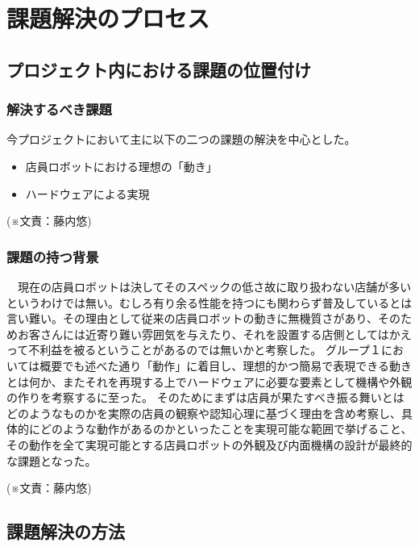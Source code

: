 \chapter{課題解決のプロセス}
\begin{comment}
各々のメンバーに割り当てられた課題解決の方法とプロセスを記述する。
\end{comment}
\section{プロジェクト内における課題の位置付け}
\subsection{解決するべき課題}
今プロジェクトにおいて主に以下の二つの課題の解決を中心とした。
\begin{itemize}
\item 店員ロボットにおける理想の「動き」
\item ハードウェアによる実現
\end{itemize}
\begin{flushright}
(※文責：藤内悠)
\end{flushright}
\subsection{課題の持つ背景}
\noindent
　現在の店員ロボットは決してそのスペックの低さ故に取り扱わない店舗が多いというわけでは無い。むしろ有り余る性能を持つにも関わらず普及しているとは言い難い。その理由として従来の店員ロボットの動きに無機質さがあり、そのためお客さんには近寄り難い雰囲気を与えたり、それを設置する店側としてはかえって不利益を被るということがあるのでは無いかと考察した。
グループ１においては概要でも述べた通り「動作」に着目し、理想的かつ簡易で表現できる動きとは何か、またそれを再現する上でハードウェアに必要な要素として機構や外観の作りを考察するに至った。
そのためにまずは店員が果たすべき振る舞いとはどのようなものかを実際の店員の観察や認知心理に基づく理由を含め考察し、具体的にどのような動作があるのかといったことを実現可能な範囲で挙げること、その動作を全て実現可能とする店員ロボットの外観及び内面機構の設計が最終的な課題となった。
\begin{flushright}
(※文責：藤内悠)
\end{flushright}
\section{課題解決の方法}

